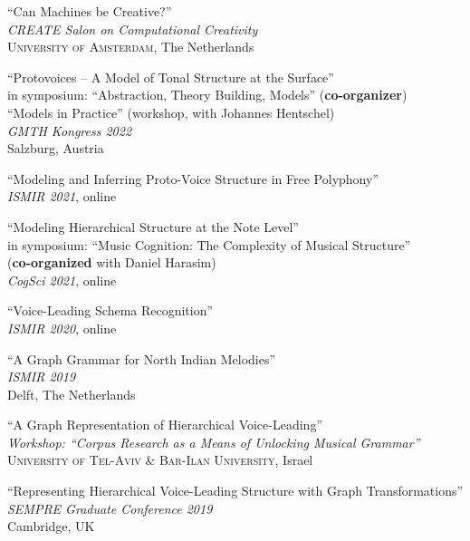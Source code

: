 \documentclass[10pt]{scrartcl}
\newcommand{\margintext}[1]{\marginpar{\raggedleft\small#1}}
\newcommand{\entry}[1]{\vphantom{x}\margintext{#1}}
\begin{document}
\entry{2022}%
\invited \enquote{Can Machines be Creative?}
\\
\textit{CREATE Salon on Computational Creativity}\\
\textsc{University of Amsterdam}, The Netherlands

\contrib \enquote{Protovoices -- A Model of Tonal Structure at the Surface}
\\
in symposium: \enquote{Abstraction, Theory Building, Models} (\textbf{co-organizer})\\
\contrib \enquote{Models in Practice} (workshop, with Johannes Hentschel)\\
\textit{GMTH Kongress 2022}\\
Salzburg, Austria

\entry{2021}%
\contrib \poster \enquote{Modeling and Inferring Proto-Voice Structure in Free Polyphony}
\\
\textit{ISMIR 2021}, online

\contrib \enquote{Modeling Hierarchical Structure at the Note Level}
\\
in symposium: \enquote{Music Cognition: The Complexity of Musical Structure}\\
(\textbf{co-organized} with Daniel Harasim)\\
\textit{CogSci 2021}, online

\entry{2020}%
\contrib \poster \enquote{Voice-Leading Schema Recognition}
\\
\textit{ISMIR 2020}, online

\entry{2019}%
\contrib \poster \enquote{A Graph Grammar for North Indian Melodies}
\\
\textit{ISMIR 2019}\\
Delft, The Netherlands

\invited \enquote{A Graph Representation of Hierarchical Voice-Leading}
\\
\textit{Workshop: \enquote{Corpus Research as a Means of Unlocking Musical Grammar}}\\
\textsc{University of Tel-Aviv \& Bar-Ilan University}, Israel

\poster \enquote{Representing Hierarchical Voice-Leading Structure with Graph Transformations}\\
\textit{SEMPRE Graduate Conference 2019}\\
Cambridge, UK
\end{document}
